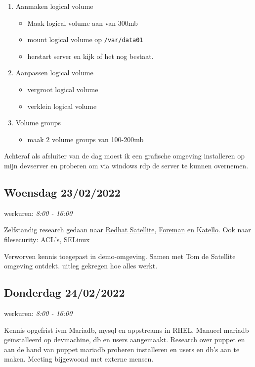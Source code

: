\begin{enumerate}
\def\labelenumi{\arabic{enumi}.}
\tightlist
\item
  Aanmaken logical volume

  \begin{itemize}
  \tightlist
  \item
    Maak logical volume aan van 300mb
  \item
    mount logical volume op \texttt{/var/data01}
  \item
    herstart server en kijk of het nog bestaat.
  \end{itemize}
\item
  Aanpassen logical volume

  \begin{itemize}
  \tightlist
  \item
    vergroot logical volume
  \item
    verklein logical volume
  \end{itemize}
\item
  Volume groups

  \begin{itemize}
  \tightlist
  \item
    maak 2 volume groups van 100-200mb
  \end{itemize}
\end{enumerate}

Achteraf als afsluiter van de dag moest ik een grafische omgeving
installeren op mijn devserver en proberen om via windows rdp de server
te kunnen overnemen.

\hypertarget{woensdag-23022022}{%
\subsection{Woensdag 23/02/2022}\label{woensdag-23022022}}

werkuren: \emph{8:00 - 16:00}

Zelfstandig research gedaan naar
\href{https://www.redhat.com/en/technologies/management/satellite}{Redhat
Satellite}, \href{https://theforeman.org}{Foreman} en
\href{https://www.theforeman.org/plugins/katello/}{Katello}. Ook naar
filesecurity: ACL's, SELinux

Verworven kennis toegepast in demo-omgeving. Samen met Tom de Satellite
omgeving ontdekt. uitleg gekregen hoe alles werkt.

\hypertarget{donderdag-24022022}{%
\subsection{Donderdag 24/02/2022}\label{donderdag-24022022}}

werkuren: \emph{8:00 - 16:00}

Kennis opgefrist ivm Mariadb, mysql en appstreams in RHEL. Manueel
mariadb geïnstalleerd op devmachine, db en users aangemaakt. Research
over puppet en aan de hand van puppet mariadb proberen installeren en
users en db's aan te maken. Meeting bijgewoond met externe mensen.

